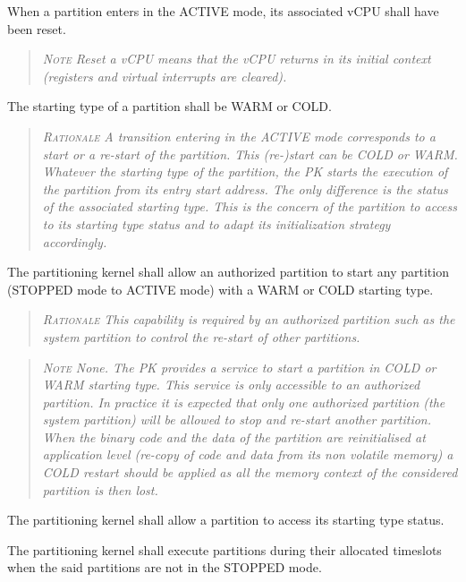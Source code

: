 When a partition enters in the ACTIVE mode,  its associated vCPU shall have been reset.
\begin{quote}\it
\textsc{Note}
Reset a vCPU means that the vCPU returns in its initial context (registers and virtual interrupts are cleared).
\end{quote}

The starting type of a partition shall be WARM or COLD.
\begin{quote}\it
\textsc{Rationale}
A transition entering in the ACTIVE mode corresponds to a start or a re-start of the partition. This (re-)start can be COLD or WARM. Whatever the starting type of the partition, the PK starts the execution of the partition from its entry start address.  The only difference is the status of the associated starting type. This is the concern of the partition to access to its starting type status and to adapt its initialization strategy accordingly.
\end{quote}

The partitioning kernel shall allow an authorized partition to start any partition (STOPPED mode to ACTIVE mode)  with a WARM or COLD starting type.
\begin{quote}\it
\textsc{Rationale}
 This capability is required by an authorized partition such as the system partition to control the re-start of other partitions.
\end{quote}
\begin{quote}\it
\textsc{Note}
None. The PK provides a service to start a partition in COLD or WARM starting type. This service is only accessible to an authorized partition.
In practice it is expected that only one authorized partition (the system partition) will be allowed to stop and re-start another partition. When the binary code and the data of the partition are reinitialised at application level (re-copy of code and data from its non volatile memory) a COLD restart should be applied as all the memory context of the considered partition is then lost.
\end{quote}

The partitioning kernel shall allow a partition to access its starting type status.

The partitioning kernel shall execute partitions during their allocated timeslots when the said partitions are not in the STOPPED mode.

